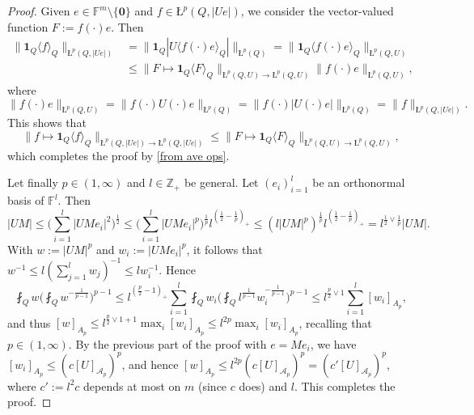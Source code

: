 \documentclass[11pt, reqno]{amsart}
\theoremstyle{definition}
\theoremstyle{remark}
\numberwithin{equation}{section}
\newcommand{\A}{\mathscr A}
\newcommand{\F}{\mathbb F}
\newcommand{\Z}{\mathbb Z}
\newcommand{\one}{\mathbf{1}}
\newcommand{\ave}[1]{\langle #1\rangle}
\newcommand{\aveL}{\textit{\L}}
\newcommand{\abs}[1]{|#1|}
\newcommand{\Norm}[2]{\|#1\|_{#2}}
\newcommand{\bNorm}[2]{\big\|#1\big\|_{#2}}
\begin{document}
\begin{proof}
Given $e\in\F^m\setminus\{\mathbf 0\}$ and $f\in\aveL^p(Q,\abs{Ue})$, we consider the vector-valued function $F:=f(\cdot)e$. Then
\begin{equation*}
\begin{split}
   \Norm{\one_Q\ave{f}_Q}{\aveL^p(Q,\abs{Ue})}
   &=\bNorm{\one_Q\abs{U\ave{f(\cdot)e}_Q}}{\aveL^p(Q)}
   =\Norm{\one_Q\ave{f(\cdot)e}_Q}{\aveL^p(Q,U)} \\
   &\leq\Norm{F\mapsto \one_Q\ave{F}_Q}{\aveL^p(Q,U)\to\aveL^p(Q,U)}
   \Norm{f(\cdot)e}{\aveL^p(Q,U)},
\end{split}
\end{equation*}
where
\begin{equation*}
  \Norm{f(\cdot)e}{\aveL^p(Q,U)}
  =\Norm{f(\cdot)U(\cdot)e}{\aveL^p(Q)}
  =\bNorm{f(\cdot)\abs{U(\cdot)e}}{\aveL^p(Q)}
  =\Norm{f}{\aveL^p(Q,\abs{Ue})}.
\end{equation*}
This shows that
\begin{equation*}
   \Norm{f\mapsto\one_Q\ave{f}_Q}{\aveL^p(Q,\abs{Ue})\to \aveL^p(Q,\abs{Ue})}
   \leq\Norm{F\mapsto\one_Q\ave{F}_Q}{\aveL^p(Q,U)\to \aveL^p(Q,U)},
\end{equation*}
which completes the proof by \eqref{from ave ops}.

Let finally $p\in(1,\infty)$ and $l\in\Z_+$ be general. Let $(e_i)_{i=1}^l$ be an orthonormal basis of $\F^l$. Then
\begin{equation*}
  \abs{UM}\leq\Big(\sum_{i=1}^l\abs{UMe_i}^2\Big)^{\frac12}
  \leq\Big(\sum_{i=1}^l\abs{UMe_i}^p\Big)^{\frac1p} l^{(\frac12-\frac1p)_+}
  \leq(l\abs{UM}^p)^{\frac1p} l^{(\frac12-\frac1p)_+}
  =l^{\frac12\vee\frac1p}\abs{UM}.
\end{equation*}
With $w:=\abs{UM}^p$ and $w_i:=\abs{UMe_i}^p$, it follows that $w^{-1}\leq l(\sum_{j=1}^l w_j)^{-1}\leq l w_i^{-1}$. Hence
\begin{equation*}
  \fint_Q w\Big(\fint_Q w^{-\frac{1}{p-1}}\Big)^{p-1}
   \leq l^{ (\frac p2-1)_+} \sum_{i=1}^l \fint_Q w_i
      \Big( \fint_Q l^{\frac{1}{p-1}}w_i^{-\frac{1}{p-1}}\Big)^{p-1}
    \leq l^{\frac p2\vee 1}\sum_{i=1}^l [w_i]_{A_p},
\end{equation*}
and thus $[w]_{A_p}\leq l^{\frac p2\vee 1+1}\max_i [w_i]_{A_p}\leq l^{2p}\max_i [w_i]_{A_p}$, recalling that $p\in(1,\infty)$.
By the previous part of the proof with $e=Me_i$, we have $[w_i]_{A_p}\leq (c[U]_{\A_p})^p$, and hence $[w]_{A_p}\leq l^{2p}(c[U]_{\A_p})^p =(c'[U]_{\A_p})^p$, where $c':=l^2 c$ depends at most on $m$ (since $c$ does) and $l$. This completes the proof.
\end{proof}
\end{document}
